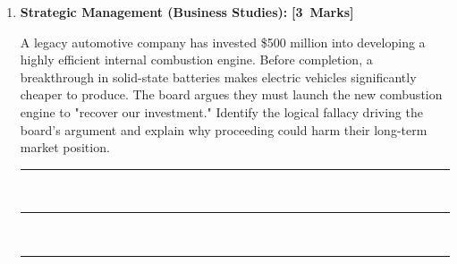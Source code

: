 \documentclass[11pt, a4paper]{article}
\begin{document}
\begin{enumerate}[resume, label=\textbf{\arabic*.}, leftmargin=*]
\needspace{5cm}
\item \textbf{Strategic Management (Business Studies):} \hfill\quad\mbox{\textbf{[3 Marks]}}
\begin{tcolorbox}[colback=white, colframe=black!50, arc=2mm, boxrule=0.8pt]
A legacy automotive company has invested \$500 million into developing a highly efficient internal combustion engine. Before completion, a breakthrough in solid-state batteries makes electric vehicles significantly cheaper to produce. The board argues they must launch the new combustion engine to "recover our investment." Identify the logical fallacy driving the board's argument and explain why proceeding could harm their long-term market position.

\vspace{0.2cm}
\noindent\rule{\linewidth}{0.4pt}\\[0.4cm]
\noindent\rule{\linewidth}{0.4pt}\\[0.4cm]
\noindent\rule{\linewidth}{0.4pt}
\end{tcolorbox}
\end{enumerate}
\end{document}
